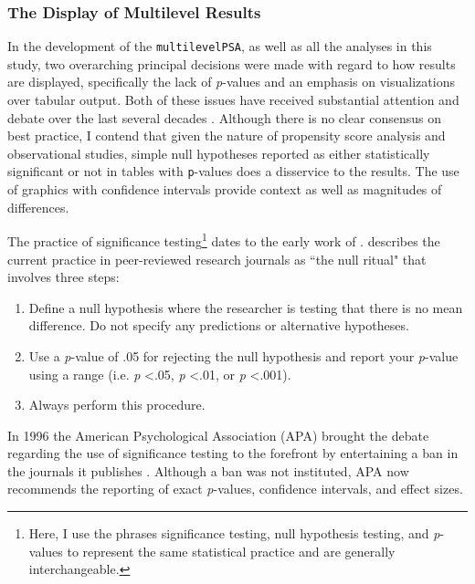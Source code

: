 \documentclass[letterpaper,12p,twoside]{article} %
\begin{document}
\subsubsection{The Display of Multilevel Results}

In the development of the \texttt{multilevelPSA}, as well as all the analyses in this study, two overarching principal decisions were made with regard to how results are displayed, specifically the lack of \textit{p}-values and an emphasis on visualizations over tabular output. Both of these issues have received substantial attention and debate over the last several decades \cite{Shrout1997,Hunter1997,Harris1997,Abelson1997,Scarr1997,Estes1997}. Although there is no clear consensus on best practice, I contend that given the nature of propensity score analysis and observational studies, simple null hypotheses reported as either statistically significant or not in tables with \texttt{p}-values does a disservice to the results. The use of graphics with confidence intervals provide context as well as magnitudes of differences.


The practice of significance testing\footnote{Here, I use the phrases significance testing, null hypothesis testing, and \textit{p}-values to represent the same statistical practice and are generally interchangeable.} dates to the early work of .  describes the current practice in peer-reviewed research journals as ``the null ritual" that involves three steps:

\begin{enumerate}
    \item Define a null hypothesis where the researcher is testing that there is no mean difference. Do not specify any predictions or alternative hypotheses.
    \item Use a \textit{p}-value of .05 for rejecting the null hypothesis and report your \textit{p}-value using a range (i.e. \textit{p} \textless .05, \textit{p} \textless .01, or \textit{p} \textless .001).
    \item Always perform this procedure.
\end{enumerate}

\noindent In 1996 the American Psychological Association (APA) brought the debate regarding the use of significance testing to the forefront by entertaining a ban in the journals it publishes \cite{Shrout1997,Hunter1997,Harris1997,Abelson1997,Scarr1997,Estes1997}. Although a ban was not instituted, APA now recommends the reporting of exact \textit{p}-values, confidence intervals, and effect sizes. 
\end{document}
